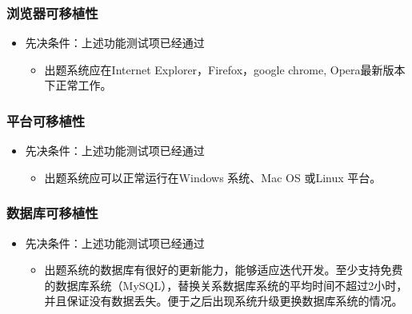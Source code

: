 \documentclass[hyperref, a4paper]{ctexart}
\providecommand{\tightlist}{%
  \setlength{\itemsep}{0pt}\setlength{\parskip}{0pt}}
\begin{document}
\hypertarget{ux6d4fux89c8ux5668ux53efux79fbux690dux6027}{%
\subsubsection{浏览器可移植性}\label{ux6d4fux89c8ux5668ux53efux79fbux690dux6027}}

\begin{itemize}
\tightlist
\item
  先决条件：上述功能测试项已经通过

  \begin{itemize}
  \tightlist
  \item
    出题系统应在Internet Explorer，Firefox，google chrome,
    Opera最新版本下正常工作。
  \end{itemize}
\end{itemize}

\hypertarget{ux5e73ux53f0ux53efux79fbux690dux6027}{%
\subsubsection{平台可移植性}\label{ux5e73ux53f0ux53efux79fbux690dux6027}}

\begin{itemize}
\tightlist
\item
  先决条件：上述功能测试项已经通过

  \begin{itemize}
  \tightlist
  \item
    出题系统应可以正常运行在Windows 系统、Mac OS 或Linux 平台。
  \end{itemize}
\end{itemize}

\hypertarget{ux6570ux636eux5e93ux53efux79fbux690dux6027}{%
\subsubsection{数据库可移植性}\label{ux6570ux636eux5e93ux53efux79fbux690dux6027}}

\begin{itemize}
\tightlist
\item
  先决条件：上述功能测试项已经通过

  \begin{itemize}
  \tightlist
  \item
    出题系统的数据库有很好的更新能力，能够适应迭代开发。至少支持免费的数据库系统（MySQL），替换关系数据库系统的平均时间不超过2小时，并且保证没有数据丢失。便于之后出现系统升级更换数据库系统的情况。
  \end{itemize}
\end{itemize}
\end{document}
